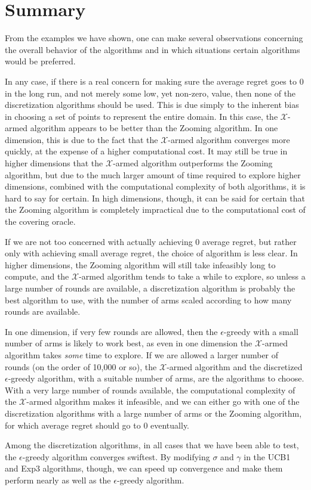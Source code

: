 \section{Summary}
From the examples we have shown, one can make several observations
concerning the overall behavior of the algorithms and in which
situations certain algorithms would be preferred.

In any case, if there is a real concern for making sure the average regret
goes to 0 in the long run, and not merely some low, yet non-zero, value, then
none of the discretization algorithms should be used.  This is due simply to
the inherent bias in choosing a set of points to represent the entire domain.
In this case, the
$\mathcal{X}$-armed algorithm appears to be better than the Zooming algorithm.
In one dimension, this is due to the fact that the $\mathcal{X}$-armed
algorithm converges more quickly, at the expense of a higher computational
cost.  It may still be true in higher dimensions that the $\mathcal{X}$-armed
algorithm outperforms the Zooming algorithm, but due to the much larger amount
of time required to explore higher dimensions, combined with the computational
complexity of both algorithms, it is hard
to say for certain.  In high dimensions, though, it can be said for certain
that the Zooming algorithm is completely impractical due to the computational
cost of the covering oracle.

If we are not too concerned with actually achieving 0 average regret, but
rather only with achieving small average regret, the choice of algorithm is
less clear.  In higher dimensions, the Zooming algorithm will still take
infeasibly long to compute, and the $\mathcal{X}$-armed algorithm tends to
take a while to explore, so unless a large number of rounds are available,
a discretization algorithm is probably the best algorithm to use, with
the number of arms scaled according to how many rounds are available.

In one dimension, if very few rounds are allowed, then the $\epsilon$-greedy
with a small number of arms is likely to work best, as even in one dimension
the $\mathcal{X}$-armed algorithm takes \emph{some} time to explore.  If
we are allowed a larger number of rounds (on the order of 10,000 or so), the
$\mathcal{X}$-armed algorithm and the discretized $\epsilon$-greedy
algorithm, with a suitable number of arms, are the algorithms to choose.  With
a very large number of rounds available, the computational complexity of the
$\mathcal{X}$-armed algorithm makes it infeasible, and we can either go with
one of the discretization algorithms with a large number of arms or the
Zooming algorithm, for which average regret should go to 0 eventually.

Among the discretization algorithms, in all cases that we have been able to
test, the $\epsilon$-greedy algorithm converges swiftest.  By modifying
$\sigma$ and $\gamma$ in the UCB1 and Exp3 algorithms, though, we can speed up
convergence and make them perform nearly as well as the $\epsilon$-greedy
algorithm.